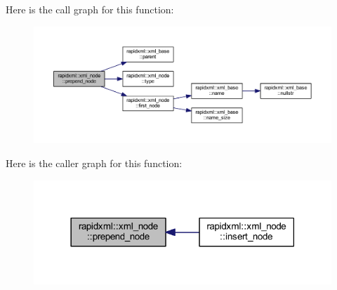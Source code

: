 Here is the call graph for this function\+:\nopagebreak
\begin{figure}[H]
\begin{center}
\leavevmode
\includegraphics[width=350pt]{singletonrapidxml_1_1xml__node_ae86e92908c3eab40bbed8216e4f3f3cb_cgraph}
\end{center}
\end{figure}




Here is the caller graph for this function\+:\nopagebreak
\begin{figure}[H]
\begin{center}
\leavevmode
\includegraphics[width=318pt]{singletonrapidxml_1_1xml__node_ae86e92908c3eab40bbed8216e4f3f3cb_icgraph}
\end{center}
\end{figure}


